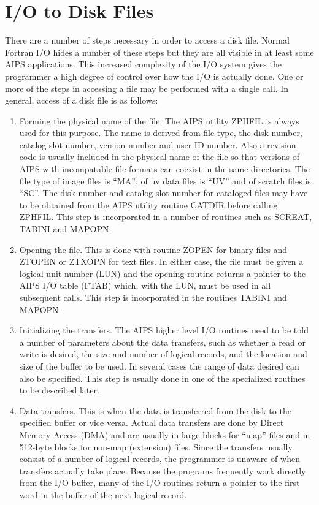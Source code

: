 \section{I/O to Disk Files}
There are a number of steps necessary in order to access a disk file.
Normal Fortran I/O hides a number of these steps but they are all
visible in at least some AIPS applications.  This increased complexity
of the I/O system gives the programmer a high degree of control over
how the I/O is actually done. One or more of the steps in accessing a
file may be performed with a single call. In general, access of a disk
file is as follows:
\begin{enumerate} %
\item Forming the physical name of the file. The AIPS utility ZPHFIL is
always used for this purpose. The name is derived from file type, the
disk number, catalog slot number, version number and user ID number.
Also a revision code is usually included in the physical name of the
file so that versions of AIPS with incompatable file formats can
coexist in the same directories.
The file type of image files is ``MA'', of uv data files is ``UV'' and of
scratch files is ``SC''. The disk number and catalog slot number for
cataloged files may have to be obtained from the AIPS utility routine
CATDIR before calling ZPHFIL. This step is incorporated in a number
of routines such as SCREAT, TABINI and MAPOPN.

\item Opening the file.  This is done with routine ZOPEN for binary files
and ZTOPEN or ZTXOPN for text files.  In either case, the file must be given a
logical unit number (LUN) and the opening routine returns a pointer
to the AIPS I/O table (FTAB) which, with the LUN, must be used in all
subsequent calls.  This step is incorporated in the routines TABINI
and MAPOPN.

\item Initializing the transfers.   The AIPS higher level I/O routines need
to be told a number of parameters about the data transfers, such as
whether a read or write is desired, the size and number of logical
records, and the location and size of the buffer to be used.  In
several cases the range of data desired can also be specified. This
step is usually done in one of the specialized routines to be
described later.

\item Data transfers.  This is when the data is transferred from the disk to
the specified buffer or vice versa.  Actual data transfers are done by
Direct Memory Access (DMA) and are usually in large blocks for ``map''
files and in 512-byte blocks for non-map (extension) files. Since the
transfers usually consist of a number of logical records, the
programmer is unaware of when transfers actually take place.  Because
the programs frequently work directly from the I/O buffer, many of the
I/O routines return a pointer to the first word in the buffer of the
next logical record.


\end{enumerate}
